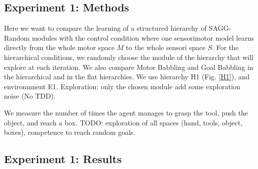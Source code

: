 \documentclass[conference]{include/IEEEtran}
\begin{document}
	
	\subsection{Experiment 1: Methods}		
				
		Here we want to compare the learning of a structured hierarchy of SAGG-Random modules with the control condition where one sensorimotor model learns
		directly from the whole motor space $M$ to the whole sensori space $S$. 
		For the hierarchical conditions, we randomly choose the module of the hierarchy that will explore at each iteration.
		We also compare Motor Babbling and Goal Babbling in the hierarchical and in the flat hierarchies.
		We use hierarchy H1 (Fig. \ref{H1}), and environmnent E1.
		Exploration: only the chosen module add some exploration noise (No TDD).
			
		We measure the number of times the agent manages to grasp the tool, push the object, and reach a box.
		TODO: exploration of all spaces (hand, tools, object, boxes), competence to reach random goals.
		
			
	\subsection{Experiment 1: Results}
	
\end{document}

